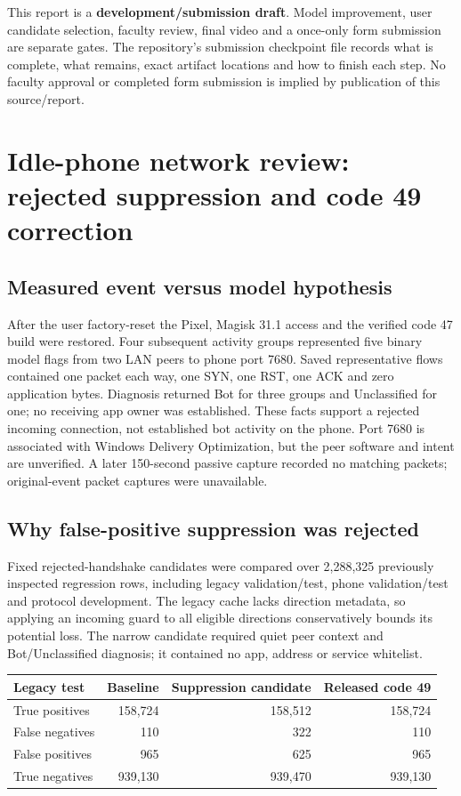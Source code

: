 \documentclass[11pt,a4paper,oneside]{report}
\begin{document}
This report is a \textbf{development/submission draft}. Model improvement, user candidate selection, faculty review, final video and a once-only form submission are separate gates. The repository's submission checkpoint file records what is complete, what remains, exact artifact locations and how to finish each step. No faculty approval or completed form submission is implied by publication of this source/report.

\chapter{Idle-phone network review: rejected suppression and code 49 correction}
\section{Measured event versus model hypothesis}
After the user factory-reset the Pixel, Magisk 31.1 access and the verified code 47 build were restored. Four subsequent activity groups represented five binary model flags from two LAN peers to phone port 7680. Saved representative flows contained one packet each way, one SYN, one RST, one ACK and zero application bytes. Diagnosis returned Bot for three groups and Unclassified for one; no receiving app owner was established. These facts support a rejected incoming connection, not established bot activity on the phone. Port 7680 is associated with Windows Delivery Optimization, but the peer software and intent are unverified. A later 150-second passive capture recorded no matching packets; original-event packet captures were unavailable.

\section{Why false-positive suppression was rejected}
Fixed rejected-handshake candidates were compared over 2,288,325 previously inspected regression rows, including legacy validation/test, phone validation/test and protocol development. The legacy cache lacks direction metadata, so applying an incoming guard to all eligible directions conservatively bounds its potential loss. The narrow candidate required quiet peer context and Bot/Unclassified diagnosis; it contained no app, address or service whitelist.

\begin{center}\small
\begin{tabular}{lrrr}\toprule
Legacy test & Baseline & Suppression candidate & Released code 49\\\midrule
True positives &158,724&158,512&158,724\\
False negatives &110&322&110\\
False positives &965&625&965\\
True negatives &939,130&939,470&939,130\\\bottomrule
\end{tabular}\end{center}
\end{document}
